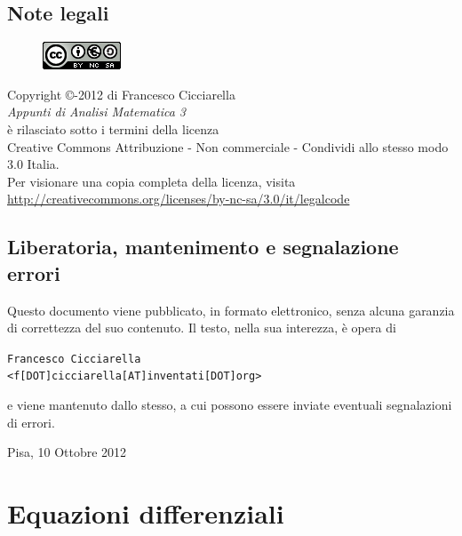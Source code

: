 \documentclass[a4paper,12pt]{report}
\theoremstyle{plain}
\theoremstyle{definition}
\theoremstyle{remark}
\numberwithin{equation}{section}
\begin{document}
\section*{Note legali}
\begin{center}
\begin{figure}[htbp]
\centering
\includegraphics[scale=1]{Addons/88x31.png}
\end{figure}
\vspace{0.5cm}
Copyright \copyright {}-2012 di Francesco Cicciarella \\
\textit{Appunti di Analisi Matematica 3} \\	
è rilasciato sotto i termini della licenza \\
Creative Commons Attribuzione - Non commerciale - Condividi allo stesso modo 3.0 Italia. \\
Per visionare una copia completa della licenza, visita \\
\url{http://creativecommons.org/licenses/by-nc-sa/3.0/it/legalcode}
\end{center}
\section*{Liberatoria, mantenimento e segnalazione errori}
Questo documento viene pubblicato, in formato elettronico, senza alcuna garanzia di correttezza del suo contenuto. Il testo, nella sua interezza, è opera di \\

\vspace{0.3cm}
\begin{flushleft}
\texttt{Francesco Cicciarella}\\
\texttt{<f[DOT]cicciarella[AT]inventati[DOT]org>}
\end{flushleft}
\vspace{0.3cm}
e viene mantenuto dallo stesso, a cui possono essere inviate eventuali segnalazioni di errori.
\vspace{1cm}
\begin{flushright}
Pisa, 10 Ottobre 2012
\end{flushright}
\pagebreak

\tableofcontents
\chapter{Equazioni differenziali}
\end{document}
